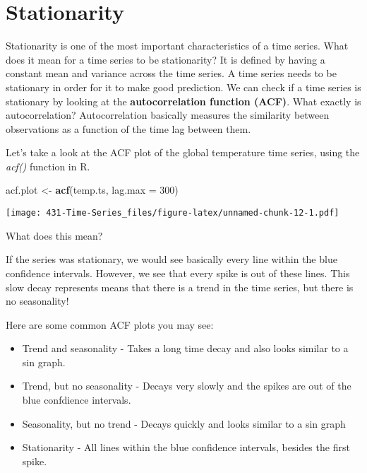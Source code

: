 \documentclass[
]{book}
\newenvironment{Shaded}{\begin{snugshade}}{\end{snugshade}}
\newcommand{\DataTypeTok}[1]{\textcolor[rgb]{0.13,0.29,0.53}{#1}}
\newcommand{\DecValTok}[1]{\textcolor[rgb]{0.00,0.00,0.81}{#1}}
\newcommand{\KeywordTok}[1]{\textcolor[rgb]{0.13,0.29,0.53}{\textbf{#1}}}
\newcommand{\NormalTok}[1]{#1}
\newcommand{\StringTok}[1]{\textcolor[rgb]{0.31,0.60,0.02}{#1}}
\providecommand{\tightlist}{%
  \setlength{\itemsep}{0pt}\setlength{\parskip}{0pt}}
\begin{document}
\hypertarget{stationarity}{%
\section{Stationarity}\label{stationarity}}

Stationarity is one of the most important characteristics of a time series. What does it mean for a time series to be stationarity? It is defined by having a constant mean and variance across the time series. A time series needs to be stationary in order for it to make good prediction. We can check if a time series is stationary by looking at the \textbf{autocorrelation function (ACF)}. What exactly is autocorrelation? Autocorrelation basically measures the similarity between observations as a function of the time lag between them.

Let's take a look at the ACF plot of the global temperature time series, using the \emph{acf()} function in R.

\begin{Shaded}
\begin{Highlighting}[]
\NormalTok{acf.plot <-}\StringTok{ }\KeywordTok{acf}\NormalTok{(temp.ts, }\DataTypeTok{lag.max =} \DecValTok{300}\NormalTok{)}
\end{Highlighting}
\end{Shaded}

\texttt{[image: 431-Time-Series\_files/figure-latex/unnamed-chunk-12-1.pdf]}

What does this mean?

If the series was stationary, we would see basically every line within the blue confidence intervals. However, we see that every spike is out of these lines. This slow decay represents means that there is a trend in the time series, but there is no seasonality!

Here are some common ACF plots you may see:

\begin{itemize}
\tightlist
\item
  Trend and seasonality - Takes a long time decay and also looks similar to a sin graph.
\item
  Trend, but no seasonality - Decays very slowly and the spikes are out of the blue confdience intervals.
\item
  Seasonality, but no trend - Decays quickly and looks similar to a sin graph
\item
  Stationarity - All lines within the blue confidence intervals, besides the first spike.
\end{itemize}
\end{document}
